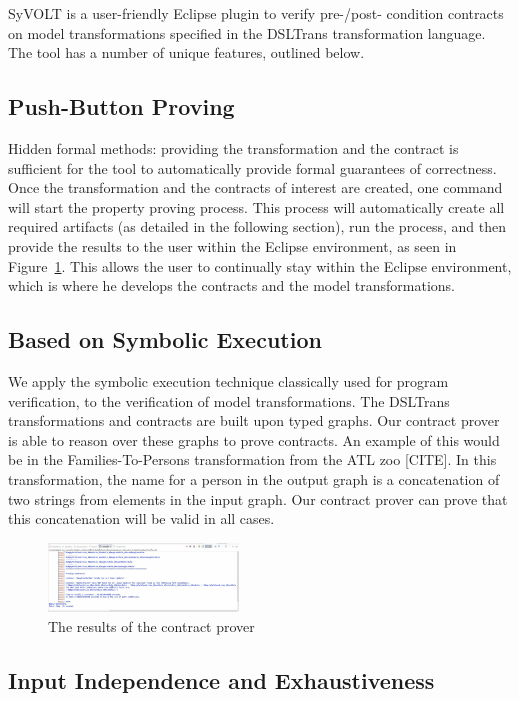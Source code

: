 SyVOLT is a user-friendly Eclipse plugin to verify pre-/post- condition
contracts on model transformations specified in the DSLTrans transformation
language. The tool has a number of unique features, outlined below.

\subsection{Push-Button Proving}
Hidden formal methods: providing the transformation and the contract is
sufficient for the tool to automatically provide formal guarantees of correctness. Once the transformation
and the contracts of interest are created, one command will start the property proving process. This process will automatically create
all required artifacts (as detailed in the following section), run the process,
and then provide the results to the user within the Eclipse environment, as seen
in Figure~\ref{fig:output}. This allows the user to continually stay within the
Eclipse environment, which is where he develops the contracts and the model transformations.

\subsection{Based on Symbolic Execution}
We apply the symbolic execution technique classically used for program
verification, to the verification of model transformations. The DSLTrans
transformations and contracts are built upon typed graphs.
Our contract prover is able to reason over these graphs to prove contracts. An
example of this would be in the Families-To-Persons transformation from the ATL
zoo [CITE]. In this transformation, the name for a person in the output graph is
a concatenation of two strings  from elements in the input graph. Our contract
prover can prove that this concatenation will be valid in all cases.

\begin{figure}
\centering
\includegraphics[width=0.45\textwidth]{figures/output}
\caption{The results of the contract prover}
\label{fig:output}
\end{figure}

\subsection{Input Independence and Exhaustiveness}


